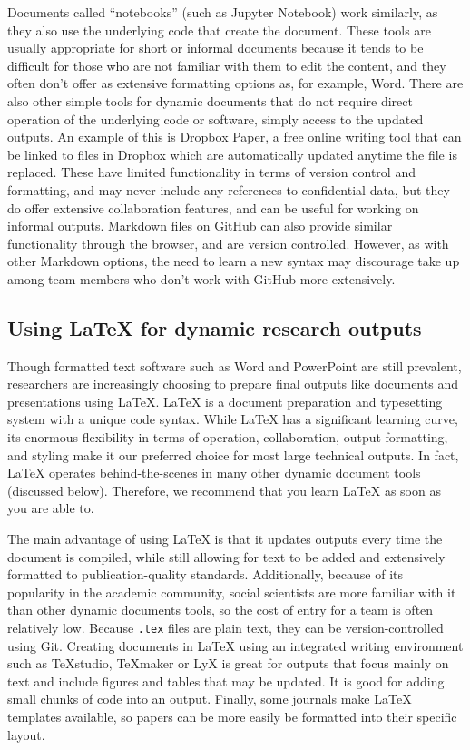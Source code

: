 Documents called ``notebooks''
(such as Jupyter Notebook)
work similarly,
as they also use the underlying code that create the document.
These tools are usually appropriate for short or informal documents
because it tends to be difficult for those who are not familiar with them to edit the content,
and they often don't offer as extensive formatting options as, for example, Word.
There are also other simple tools for dynamic documents
that do not require direct operation of the underlying code or software,
simply access to the updated outputs.
An example of this is Dropbox Paper,
a free online writing tool that can be linked to files in Dropbox
which are automatically updated anytime the file is replaced.
These have limited functionality in terms of version control and formatting,
and may never include any references to confidential data,
but they do offer extensive collaboration features,
and can be useful for working on informal outputs.
Markdown files on GitHub can also provide similar functionality through the browser,
and are version controlled.
However, as with other Markdown options, the need to learn a new syntax may
discourage take up among team members who don't work with GitHub more extensively.

\subsection{Using {\LaTeX} for dynamic research outputs}

Though formatted text software such as Word and PowerPoint are still prevalent,
researchers are increasingly choosing to prepare final outputs
like documents and presentations using {\LaTeX}.\index{{\LaTeX}}
{\LaTeX} is a document preparation and typesetting system with a unique code syntax.
While {\LaTeX} has a significant learning curve,
its enormous flexibility in terms of operation, collaboration, output formatting, and styling
make it our preferred choice for most large technical outputs.
In fact, {\LaTeX} operates behind-the-scenes in many other dynamic document tools (discussed below).
Therefore, we recommend that you learn {\LaTeX} as soon as you are able to.

The main advantage of using {\LaTeX} is that it updates outputs every time the document is compiled,
while still allowing for text to be added
and extensively formatted to publication-quality standards.
Additionally, because of its popularity in the academic community,
social scientists are more familiar with it than other dynamic documents tools,
so the cost of entry for a team is often relatively low.
Because \texttt{.tex} files are plain text,
they can be version-controlled using Git.
Creating documents in {\LaTeX} using an integrated writing environment such as TeXstudio, TeXmaker or LyX
is great for outputs that focus mainly on text
and include figures and tables that may be updated.
It is good for adding small chunks of code into an output.
Finally, some journals make {\LaTeX} templates available,
so papers can be more easily be formatted into their specific layout.


